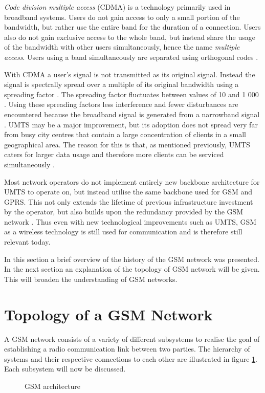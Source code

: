 \emph{Code division multiple access} (CDMA) is a technology primarily used in broadband systems. Users do not gain access to only a small portion of the bandwidth, but rather use the entire band for the duration of a connection. Users also do not gain exclusive access to the whole band, but instead share the usage of the bandwidth with other users simultaneously, hence the name \emph{multiple access}. Users using a band simultaneously are separated using orthogonal codes \cite{GSMArchitectureProtocolsServices}.

With CDMA a user's signal is not transmitted as its original signal. Instead the signal is spectrally spread over a multiple of its original bandwidth using a spreading factor \cite{GSMArchitectureProtocolsServices}. The spreading factor fluctuates between values of 10 and 1 000 \cite{GSMArchitectureProtocolsServices}. Using these spreading factors less interference and fewer disturbances are encountered because the broadband signal is generated from a narrowband signal \cite{GSMArchitectureProtocolsServices}.
UMTS may be a major improvement, but its adoption does not spread very far from busy city centres that contain a large concentration of clients in a small geographical area. The reason for this is that, as mentioned previously, UMTS caters for larger data usage and therefore more clients can be serviced simultaneously \cite{GSMArchitectureProtocolsServices}.

Most network operators do not implement entirely new backbone architecture for UMTS\label{UMTSGSMBackbone} to operate on, but instead utilise the same backbone used for GSM and GPRS. This not only extends the lifetime of previous infrastructure investment by the operator, but also builds upon the redundancy provided by the GSM network \cite{GSMArchitectureProtocolsServices}. Thus even with new technological improvements such as UMTS, GSM as a wireless technology is still used for communication and is therefore still relevant today.

In this section a brief overview of the history of the GSM network was presented. In the next section an explanation of the topology of GSM network will be given. This will broaden the understanding of GSM networks.

\section{Topology of a GSM Network}
\label{sec:GSMArch}
A GSM network consists of a variety of different subsystems to realise the goal of establishing a radio communication link between two parties. The hierarchy of systems and their respective connections to each other are illustrated in figure \ref{fig:GSMArchitecture}. Each subsystem will now be discussed.
\begin{figure}[H]
	\begin{centering}
		
		\caption{GSM architecture\cite{GSMArchitectureProtocolsServices}}
		\label{fig:GSMArchitecture}
	\end{centering}
\end{figure}
